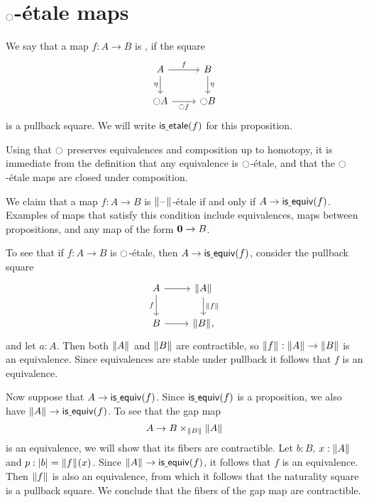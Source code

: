 \documentclass[9pt,twosided]{amsart}
\begin{document}
\section{\texorpdfstring{${\ocircle}$}{○}-\'etale maps}

\begin{defn}
We say that a map $f:A\to B$ is , if the square
\begin{equation*}
\begin{tikzcd}
A \arrow[r,"f"] \arrow[d,swap,"\eta"] & B \arrow[d,"\eta"] \\
\modal A \arrow[r,swap,"\modal f"] & \modal B
\end{tikzcd}
\end{equation*}
is a pullback square. We will write $\mathsf{is\underline{\ }{}etale}(f)$ for this proposition.
\end{defn}

Using that ${\ocircle}$ preserves equivalences and composition up to homotopy,
it is immediate from the definition that any equivalence is ${\ocircle}$-\'etale, and that the ${\ocircle}$-\'etale maps are closed under composition.

\begin{eg}\label{eg:etale_prop}
We claim that a map $f:A\to B$ is $\brck{\blank}$-\'etale if and only if $A\to \mathsf{is\underline{\ }{}equiv}(f)$. Examples of maps that satisfy this condition include equivalences, maps between propositions, and any map of the form $\mathbf{0}\to B$.

To see that if $f:A\to B$ is ${\ocircle}$-\'etale, then $A\to\mathsf{is\underline{\ }{}equiv}(f)$, consider the pullback square
\begin{equation*}
\begin{tikzcd}
A \arrow[r] \arrow[d,swap,"f"] & \brck{A} \arrow[d,"\brck{f}"] \\
B \arrow[r] & \brck{B},
\end{tikzcd}
\end{equation*}
and let $a:A$. Then both $\brck{A}$ and $\brck{B}$ are contractible, so $\brck{f}:\brck{A}\to\brck{B}$ is an equivalence. Since equivalences are stable under pullback it follows that $f$ is an equivalence.

Now suppose that $A\to \mathsf{is\underline{\ }{}equiv}(f)$. Since $\mathsf{is\underline{\ }{}equiv}(f)$ is a proposition, we also have $\brck{A}\to\isequiv(f)$. To see that the gap map
\begin{equation*}
A \to B\times_{\brck{B}}\brck{A}
\end{equation*}
is an equivalence, we will show that its fibers are contractible. Let $b:B$, $x:\brck{A}$ and $p:\bproj{b}=\brck{f}(x)$. Since $\brck{A}\to\isequiv(f)$, it follows that $f$ is an equivalence. Then $\brck{f}$ is also an equivalence, from which it follows that the naturality square is a pullback square. We conclude that the fibers of the gap map are contractible. 
\end{eg}
\end{document}
